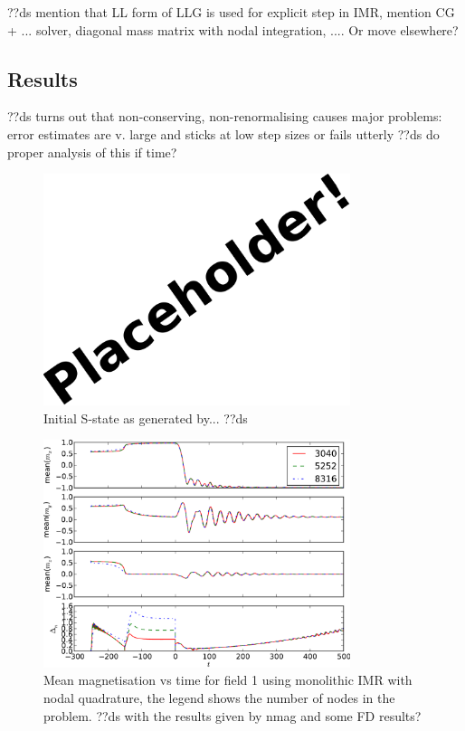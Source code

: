 ??ds mention that LL form of LLG is used for explicit step in IMR, mention CG + ... solver, diagonal mass matrix with nodal integration, .... Or move elsewhere?




\subsection{Results}


??ds turns out that non-conserving, non-renormalising causes major problems: error estimates are v. large and sticks at low step sizes or fails utterly
??ds do proper analysis of this if time?

\begin{figure}
  \centering
  \includegraphics[width=0.8\textwidth]{images/placeholder}
  \caption{Initial S-state as generated by... ??ds}
  \label{fig:intial-mumag4}
\end{figure}


\begin{figure}
  \centering
  \includegraphics[width=0.8\textwidth]{plots/mumag4_convergence/mumag4_field1-meanmxsvs-meanmysvs-meanmzsvs-dtsvstimes.pdf}
  \caption{Mean magnetisation vs time for field 1 using monolithic IMR with nodal quadrature, the legend shows the number of nodes in the problem.
    ??ds with the results given by nmag and some FD results?}
  \label{fig:nmag-comparison-mumag4-field1}
\end{figure}

